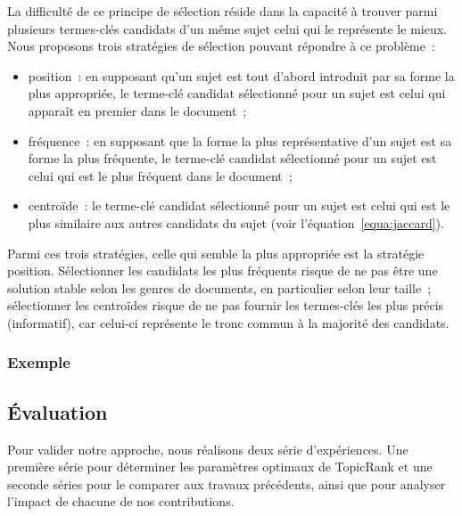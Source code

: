         La difficulté de ce principe de sélection réside dans la capacité à
        trouver parmi plusieurs termes-clés candidats d'un même sujet celui qui
        le représente le mieux. Nous proposons trois stratégies de sélection
        pouvant répondre à ce problème~:
        \begin{itemize}
          \item{position~: en supposant qu'un sujet est tout d'abord
                introduit par sa forme la plus appropriée, le terme-clé
                candidat sélectionné pour un sujet est celui qui apparaît en
                premier dans le document~;}
          \item{fréquence~: en supposant que la forme la plus représentative
                d'un sujet est sa forme la plus fréquente, le terme-clé candidat
                sélectionné pour un sujet est celui qui est le plus fréquent
                dans le document~;}
          \item{centroïde~: le terme-clé candidat sélectionné pour un sujet
                est celui qui est le plus similaire aux autres candidats du
                sujet (voir l'équation~\ref{equa:jaccard}).}
        \end{itemize}
        Parmi ces trois stratégies, celle qui semble la plus appropriée est la
        stratégie position. Sélectionner les candidats les plus fréquents risque
        de ne pas être une solution stable selon les genres de documents, en
        particulier selon leur taille~; sélectionner les centroïdes risque de ne
        pas fournir les termes-clés les plus précis (informatif), car celui-ci
        représente le tronc commun à la majorité des candidats.

      \subsubsection{Exemple}
      \label{subsubsec:main:domain_independent_keyphrase_extraction-unsupervised_automatic_keyphrase_extraction-topicrank-example}

    \subsection{Évaluation}
    \label{subsec:main:domain_independent_keyphrase_extraction-unsupervised_automatic_keyphrase_extraction-evaluation}
      Pour valider notre approche, nous réalisons deux série d'expériences. Une
      première série pour déterminer les paramètres optimaux de TopicRank et
      une seconde séries pour le comparer aux travaux précédents, ainsi
      que pour analyser l'impact de chacune de nos contributions.
      
